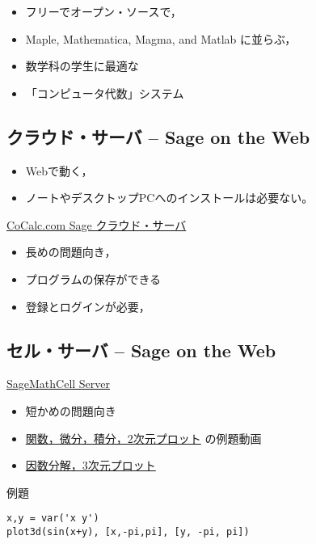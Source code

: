 \documentclass[dvipdfmx,11pt]{jarticle}
\begin{document}
\begin{itemize}
\item フリーでオープン・ソースで，
\item Maple, Mathematica, Magma, and Matlab に並らぶ，
\item 数学科の学生に最適な
\item 「コンピュータ代数」システム
\end{itemize}

\subsection{クラウド・サーバ -- Sage on the Web}
\label{sec:org14f449b}

\begin{itemize}
\item Webで動く，
\item ノートやデスクトップPCへのインストールは必要ない。
\end{itemize}

\href{http://www.cocalc.com/}{CoCalc.com Sage クラウド・サーバ} 

\begin{itemize}
\item 長めの問題向き，
\item プログラムの保存ができる
\item 登録とログインが必要，
\end{itemize}

\subsection{セル・サーバ -- Sage on the Web}
\label{sec:org969e24a}

\href{http://sagecell.sagemath.org/}{SageMathCell Server}

\begin{itemize}
\item 短かめの問題向き

\item \href{http://www.gregorybard.com/videos/Sage\_part1.swf}{関数，微分，積分，2次元プロット} の例題動画

\item \href{http://www.gregorybard.com/videos/Sage\_part2.swf}{因数分解，3次元プロット}
\end{itemize}

例題

\begin{verbatim}
x,y = var('x y')
plot3d(sin(x+y), [x,-pi,pi], [y, -pi, pi])
\end{verbatim}
\end{document}
